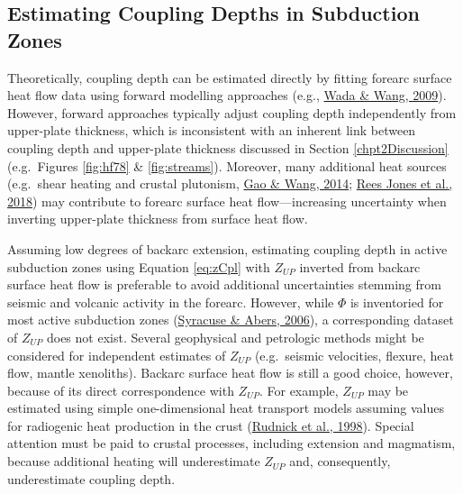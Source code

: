 \hypertarget{estimating-coupling-depths-in-subduction-zones}{%
\subsection{Estimating Coupling Depths in Subduction Zones}\label{estimating-coupling-depths-in-subduction-zones}}

Theoretically, coupling depth can be estimated directly by fitting forearc surface heat flow data using forward modelling approaches (e.g., \protect\hyperlink{ref-wada2009}{Wada \& Wang, 2009}). However, forward approaches typically adjust coupling depth independently from upper-plate thickness, which is inconsistent with an inherent link between coupling depth and upper-plate thickness discussed in Section \ref{chpt2Discussion} (e.g.~Figures \ref{fig:hf78} \& \ref{fig:streams}). Moreover, many additional heat sources (e.g.~shear heating and crustal plutonism, \protect\hyperlink{ref-gao2014}{Gao \& Wang, 2014}; \protect\hyperlink{ref-reesjones2018}{Rees Jones et al., 2018}) may contribute to forearc surface heat flow---increasing uncertainty when inverting upper-plate thickness from surface heat flow.

Assuming low degrees of backarc extension, estimating coupling depth in active subduction zones using Equation \eqref{eq:zCpl} with \(Z_{UP}\) inverted from backarc surface heat flow is preferable to avoid additional uncertainties stemming from seismic and volcanic activity in the forearc. However, while \(\Phi\) is inventoried for most active subduction zones (\protect\hyperlink{ref-syracuse2006}{Syracuse \& Abers, 2006}), a corresponding dataset of \(Z_{UP}\) does not exist. Several geophysical and petrologic methods might be considered for independent estimates of \(Z_{UP}\) (e.g.~seismic velocities, flexure, heat flow, mantle xenoliths). Backarc surface heat flow is still a good choice, however, because of its direct correspondence with \(Z_{UP}\). For example, \(Z_{UP}\) may be estimated using simple one-dimensional heat transport models assuming values for radiogenic heat production in the crust (\protect\hyperlink{ref-rudnick1998}{Rudnick et al., 1998}). Special attention must be paid to crustal processes, including extension and magmatism, because additional heating will underestimate \(Z_{UP}\) and, consequently, underestimate coupling depth.

